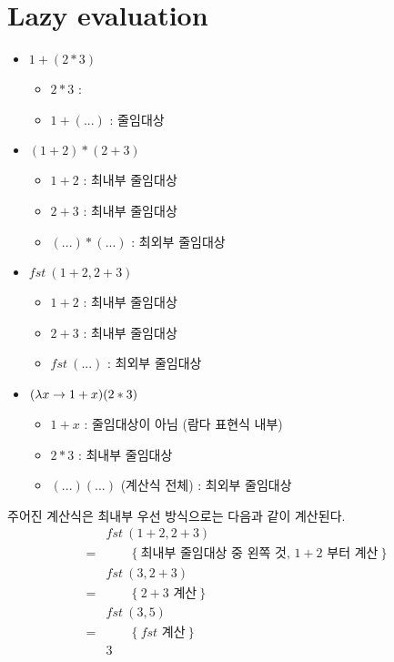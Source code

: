 \chapter{\Large{Lazy evaluation}}

\begin{itemize}
\item $1 + (2 * 3)$
  \begin{itemize}
  \item $2 * 3$ :  
  \item $1 + (...)$ :  줄임대상
  \end{itemize}
\item $(1 + 2) * (2 + 3)$
  \begin{itemize}
  \item $1 + 2$ : 최내부 줄임대상
  \item $2 + 3$ : 최내부 줄임대상
  \item $(...) * (...)$ : 최외부 줄임대상
  \end{itemize}
\item $fst~(1 + 2, 2 + 3)$
  \begin{itemize}
  \item $1 + 2$ : 최내부 줄임대상
  \item $2 + 3$ : 최내부 줄임대상
  \item $fst~(...)$ : 최외부 줄임대상
  \end{itemize}
\item $(\lambda x \rightarrow 1 + x) (2 * 3)$
  \begin{itemize}
  \item $1 + x$ : 줄임대상이 아님 (람다 표현식 내부)
  \item $2 * 3$ : 최내부 줄임대상
  \item $(...) (...)$ (계산식 전체) : 최외부 줄임대상
  \end{itemize}
\end{itemize}


주어진 계산식은 최내부 우선 방식으로는 다음과 같이 계산된다.
\begin{align*}
    & fst~(1+2,2+3) \\
  = & \qquad \{~ \text{최내부 줄임대상 중 왼쪽 것, $1+2$ 부터 계산} ~\} \\
    & fst~(3,2+3) \\
  = & \qquad \{~ \text{$2+3$ 계산} ~\} \\
    & fst~(3,5) \\
  = & \qquad \{~ \text{$fst$ 계산} ~\} \\
    & 3
\end{align*}

